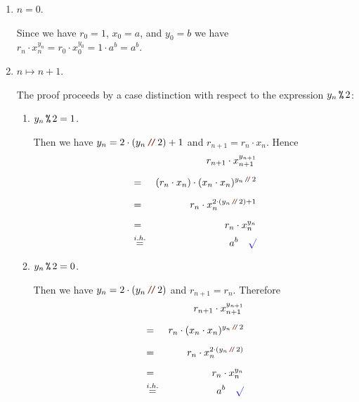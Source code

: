 \begin{enumerate}
\item[B.C.:] $n=0$.

            Since we have $r_0 = 1$, $x_0 = a$, and $y_0 = b$ we have 
            \\[0.2cm]
            \hspace*{1.3cm}
            $r_n \cdot x_n^{y_n} = r_0 \cdot x_0^{y_0} = 1 \cdot a^{b} = a^b$. \mycheck
\item[I.S.:] $n \mapsto n + 1$.

            The proof proceeds by a case distinction with respect to the expression $y_n \,\texttt{\%}\, 2$:
            \begin{enumerate}
            \item $y_n \,\texttt{\%}\, 2 = 1$.

                  Then we have $y_{n} = 2 \cdot (y_n\dv 2) + 1$ and
                  $r_{n+1} = r_n \cdot x_n$.  Hence
                  \begin{eqnarray*}
                      &   & r_{n+1} \cdot x_{n+1}^{y_{n+1}} \\[0.2cm] 
                      & = & (r_{n} \cdot x_n) \cdot (x_{n} \cdot x_{n})^{y_{n}\dvv 2} \\[0.2cm] 
                      & = & r_{n} \cdot x_n^{2 \cdot (y_{n}\dvv 2) + 1} \\[0.2cm] 
                      & = & r_{n} \cdot x_n^{y_n} \\
                      & \stackrel{i.h.}{=} & a^{b} \quad \text{\mycheck}
                  \end{eqnarray*}

            \item $y_n \,\texttt{\%}\, 2 = 0$.

                  Then we have $y_{n} = 2 \cdot (y_n\dv 2)$ and $r_{n+1} = r_n$.
                  Therefore
                  \begin{eqnarray*}
                      &   & r_{n+1} \cdot x_{n+1}^{y_{n+1}} \\[0.2cm] 
                      & = & r_{n} \cdot (x_{n} \cdot x_{n})^{y_{n}\dvv 2} \\[0.2cm] 
                      & = & r_{n} \cdot x_n^{2 \cdot (y_{n} \dvv 2)} \\[0.2cm] 
                      & = & r_{n} \cdot x_n^{y_n} \\
                      & \stackrel{i.h.}{=} & a^{b} \quad \text{\mycheck}
                  \end{eqnarray*}
            \end{enumerate}
\end{enumerate}
